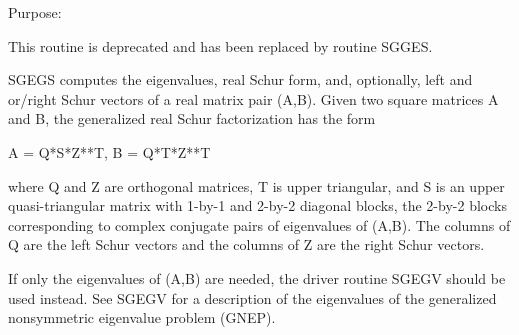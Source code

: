  \begin{DoxyParagraph}{Purpose\+: }
\begin{DoxyVerb} This routine is deprecated and has been replaced by routine SGGES.

 SGEGS computes the eigenvalues, real Schur form, and, optionally,
 left and or/right Schur vectors of a real matrix pair (A,B).
 Given two square matrices A and B, the generalized real Schur
 factorization has the form
 
   A = Q*S*Z**T,  B = Q*T*Z**T

 where Q and Z are orthogonal matrices, T is upper triangular, and S
 is an upper quasi-triangular matrix with 1-by-1 and 2-by-2 diagonal
 blocks, the 2-by-2 blocks corresponding to complex conjugate pairs
 of eigenvalues of (A,B).  The columns of Q are the left Schur vectors
 and the columns of Z are the right Schur vectors.
 
 If only the eigenvalues of (A,B) are needed, the driver routine
 SGEGV should be used instead.  See SGEGV for a description of the
 eigenvalues of the generalized nonsymmetric eigenvalue problem
 (GNEP).\end{DoxyVerb}
 
\end{DoxyParagraph}


